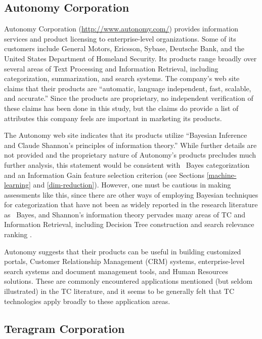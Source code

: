 \subsection{Autonomy Corporation}

Autonomy Corporation (\url{http://www.autonomy.com/}) provides
information services and product licensing to enterprise-level
organizations.  Some of its customers include General Motors,
Ericsson, Sybase, Deutsche Bank, and the United States Department of
Homeland Security.  Its products range broadly over several areas of
Text Processing and Information Retrieval, including categorization,
summarization, and search systems.  The company's web site claims that
their products are ``automatic, language independent, fast, scalable,
and accurate.''  Since the products are proprietary, no independent
verification of these claims has been done in this study, but the
claims do provide a list of attributes this company feels are
important in marketing its products.

The Autonomy web site indicates that its products utilize ``Bayesian
Inference and Claude Shannon's principles of information theory.''
While further details are not provided and the proprietary nature of
Autonomy's products precludes much further analysis, this statement
would be
consistent with \naive\ Bayes categorization and an Information Gain
feature selection criterion (see Sections \ref{machine-learning} and
\ref{dim-reduction}).  However, one must be cautious in making
assessments like this, since there are other ways of employing
Bayesian techniques for categorization that have not been as widely
reported in the research literature as \naive\ Bayes, and Shannon's
information theory pervades many areas of TC and Information
Retrieval, including Decision Tree construction
\cite{quinlan:89,wallace:93} and search relevance ranking
\cite{greiff:00}.

Autonomy suggests that their products can be useful in building
customized portals, Customer Relationship Management (CRM) systems,
enterprise-level search systems and document management tools, and
Human Resources solutions.  These are commonly encountered
applications mentioned (but seldom illustrated) in the TC literature,
and it seems to be generally felt that TC technologies apply broadly
to these application areas.

\subsection{Teragram Corporation}

